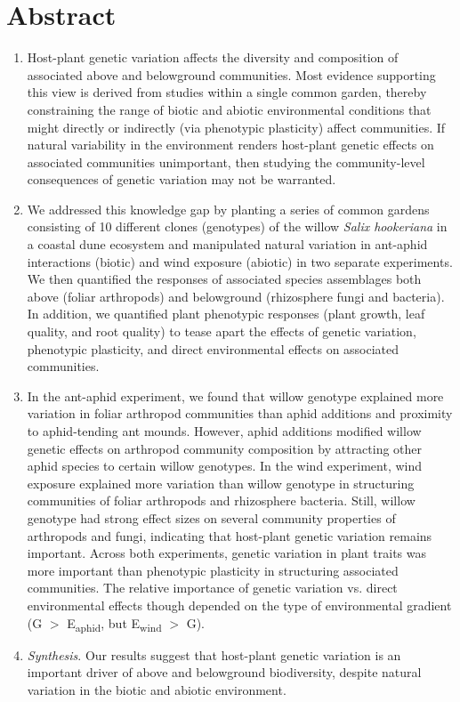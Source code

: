 \documentclass[11pt]{article}
\begin{document}
\section*{Abstract}
\begin{enumerate} %
\item
Host-plant genetic variation affects the diversity and composition of
  associated above and belowground communities. Most evidence supporting
  this view is derived from studies within a single common garden,
  thereby constraining the range of biotic and abiotic environmental
  conditions that might directly or indirectly (via phenotypic
  plasticity) affect communities. If natural variability in the
  environment renders host-plant genetic effects on associated
  communities unimportant, then studying the community-level
  consequences of genetic variation may not be warranted. 
\item
We addressed this knowledge gap by planting a series of common gardens
  consisting of 10 different clones (genotypes) of the willow
  \emph{Salix hookeriana} in a coastal dune ecosystem and manipulated
  natural variation in ant-aphid interactions (biotic) and wind exposure
  (abiotic) in two separate experiments. We then quantified the
  responses of associated species assemblages both above (foliar
  arthropods) and belowground (rhizosphere fungi and bacteria). In
  addition, we quantified plant phenotypic responses (plant growth, leaf
  quality, and root quality) to tease apart the effects of genetic variation, phenotypic plasticity, and direct environmental
  effects on associated communities. 
\item
In the ant-aphid experiment, we found that willow genotype explained
  more variation in foliar arthropod communities than aphid additions
  and proximity to aphid-tending ant mounds. However, aphid additions
  modified willow genetic effects on arthropod community composition by
  attracting other aphid species to certain willow genotypes. In the
  wind experiment, wind exposure explained more variation than willow
  genotype in structuring communities of foliar arthropods and rhizosphere bacteria. Still,
  willow genotype had strong effect sizes on several community
  properties of arthropods and fungi, indicating that host-plant genetic
  variation remains important. Across both experiments, genetic variation in plant traits was more important than phenotypic plasticity in structuring associated communities. The relative importance of genetic variation vs. direct environmental effects though depended on the type of environmental gradient (G $>$ E\textsubscript{aphid}, but E\textsubscript{wind} $>$ G). 
\item
\textit{Synthesis}. Our results suggest that host-plant genetic variation is an important driver of above and belowground biodiversity, despite natural variation in the biotic and abiotic environment.
\end{enumerate}
\end{document}
